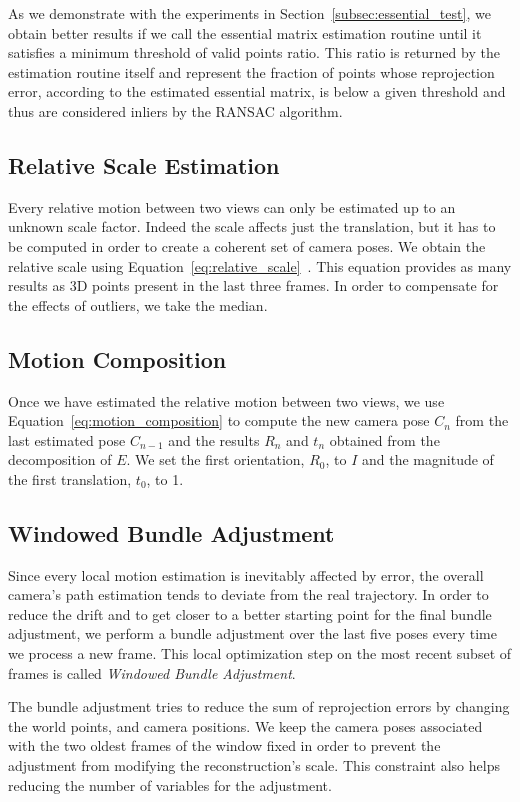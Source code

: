 As we demonstrate with the experiments in Section~\ref{subsec:essential_test}, we obtain better
results if we call the essential matrix estimation routine until it satisfies
a minimum threshold of valid points ratio. This ratio is returned by the
estimation routine itself and represent the fraction of points whose
reprojection error, according to the estimated essential matrix,
is below a given threshold and thus are
considered inliers by the RANSAC algorithm.

\subsection{Relative Scale Estimation}
Every relative motion between two views can only be estimated up to an unknown 
scale factor. Indeed the scale affects just the translation, but it has to 
be computed in order to create a coherent set of camera poses.
We obtain the relative scale using 
Equation~\ref{eq:relative_scale}~\cite{scaramuzzaVisualOdometryI}.
This equation provides as many results as 3D points present in the last three
frames. In order to compensate for the effects of outliers, we take the 
median.

\subsection{Motion Composition}
Once we have estimated the relative motion between two views, we use 
Equation~\ref{eq:motion_composition} to compute the new camera pose $C_n$ from 
the last estimated pose $C_{n-1}$ and the results $R_{n}$ and $t_n$ obtained 
from the decomposition of $E$.
We set the first orientation, $R_0$, to $I$ and the magnitude of the first 
translation, $t_0$, to 1.

\subsection{Windowed Bundle Adjustment}\label{subsec:windowed_ba}
Since every local motion estimation is inevitably affected by error, the overall 
camera's path estimation tends to deviate from the real trajectory.
In order to reduce the drift and to get closer to a better starting point 
for the final bundle adjustment, we perform a bundle adjustment over the last five poses every time we process a new frame.
This local optimization step on the most recent subset of frames is called
\textit{Windowed Bundle Adjustment}.

The bundle adjustment tries to reduce the sum of reprojection errors by changing the
world points, and camera positions. 
We keep the camera poses associated with the two oldest frames of the window 
fixed in order to prevent the adjustment from modifying the reconstruction's 
scale. This constraint also helps reducing the number of variables for the 
adjustment.

